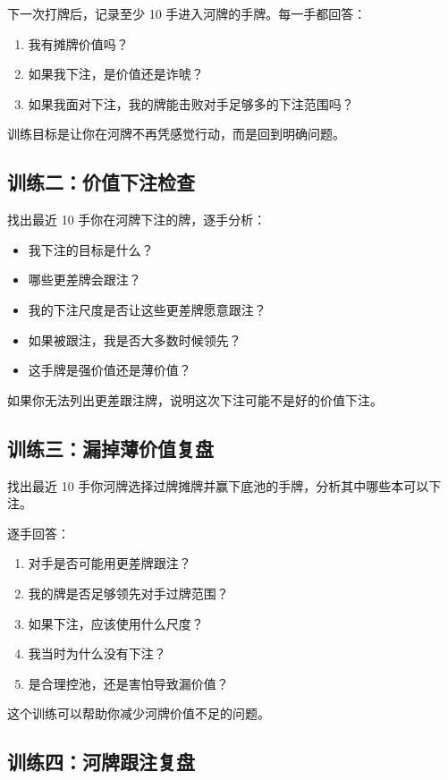 下一次打牌后，记录至少 10 手进入河牌的手牌。每一手都回答：

\begin{enumerate}
\item 我有摊牌价值吗？
\item 如果我下注，是价值还是诈唬？
\item 如果我面对下注，我的牌能击败对手足够多的下注范围吗？
\end{enumerate}

训练目标是让你在河牌不再凭感觉行动，而是回到明确问题。

\subsection*{训练二：价值下注检查}

找出最近 10 手你在河牌下注的牌，逐手分析：

\begin{itemize}
\item 我下注的目标是什么？
\item 哪些更差牌会跟注？
\item 我的下注尺度是否让这些更差牌愿意跟注？
\item 如果被跟注，我是否大多数时候领先？
\item 这手牌是强价值还是薄价值？
\end{itemize}

如果你无法列出更差跟注牌，说明这次下注可能不是好的价值下注。

\subsection*{训练三：漏掉薄价值复盘}

找出最近 10 手你河牌选择过牌摊牌并赢下底池的手牌，分析其中哪些本可以下注。

逐手回答：

\begin{enumerate}
\item 对手是否可能用更差牌跟注？
\item 我的牌是否足够领先对手过牌范围？
\item 如果下注，应该使用什么尺度？
\item 我当时为什么没有下注？
\item 是合理控池，还是害怕导致漏价值？
\end{enumerate}

这个训练可以帮助你减少河牌价值不足的问题。

\subsection*{训练四：河牌跟注复盘}

